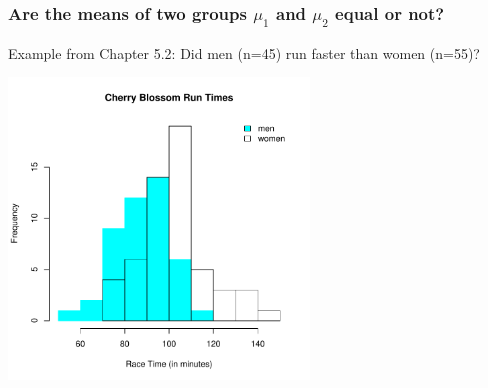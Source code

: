 \documentclass[handout]{beamer}
\begin{document}
%
%
\begin{frame}[fragile]
\frametitle{Are the means of two groups $\mu_1$ and $\mu_2$ equal or not?}

Example from Chapter 5.2:  Did men (n=45) run faster than women (n=55)?
\begin{center}
\includegraphics[width=0.6\textwidth]{figure/race.pdf}
\end{center}

\end{frame}
\end{document}
